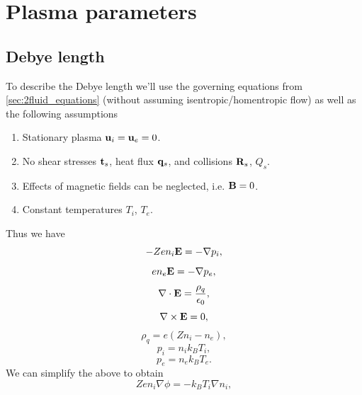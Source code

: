 \documentclass[a4paper,11pt]{report}
\begin{document}
\chapter{Plasma parameters}

\section{Debye length}
To describe the Debye length we'll use the governing equations from \cref{sec:2fluid_equations} (without assuming isentropic/homentropic flow) as well as the following assumptions
\begin{enumerate}
    \item Stationary plasma $\mathbf{u}_i = \mathbf{u}_e = 0$.
    \item No shear stresses $\mathbf{t}_s$, heat flux $\mathbf{q}_s$, and collisions $\mathbf{R}_s$, $Q_s$.
    \item Effects of magnetic fields can be neglected, i.e. $\mathbf{B}=0$.
    \item Constant temperatures $T_i$, $T_e$.
\end{enumerate}
Thus we have
\begin{equation*}
    -Zen_i\mathbf{E} = -\nabla p_i,
\end{equation*}
\begin{equation*}
    en_e\mathbf{E} = -\nabla p_e,
\end{equation*}
\begin{equation*}
    \nabla \cdot \mathbf{E} = \frac{\rho_q}{\epsilon_0},
\end{equation*}
\begin{equation*}
    \nabla \times \mathbf{E} = 0,
\end{equation*}
\begin{equation*}
    \rho_q = e(Zn_i - n_e),
\end{equation*}
\begin{equation*}
    p_i = n_i k_B T_i,
\end{equation*}
\begin{equation*}
    p_e = n_e k_B T_e.
\end{equation*}
We can simplify the above to obtain
\begin{equation*}
    Zen_i \nabla \phi = -k_B T_i \nabla n_i,
\end{equation*}
\end{document}
